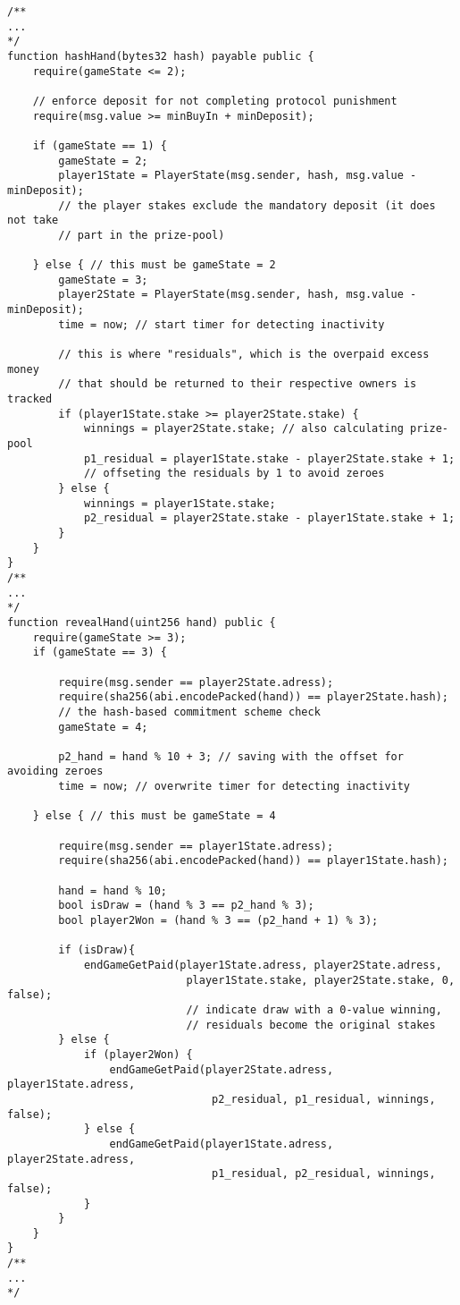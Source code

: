 \documentclass{article}
\begin{document}
    \begin{lstlisting}[language=Solidity]
/**
...
*/
function hashHand(bytes32 hash) payable public {
    require(gameState <= 2);
    
    // enforce deposit for not completing protocol punishment
    require(msg.value >= minBuyIn + minDeposit); 
    
    if (gameState == 1) {
        gameState = 2;
        player1State = PlayerState(msg.sender, hash, msg.value - minDeposit);
        // the player stakes exclude the mandatory deposit (it does not take 
        // part in the prize-pool)
        
    } else { // this must be gameState = 2
        gameState = 3;
        player2State = PlayerState(msg.sender, hash, msg.value - minDeposit);
        time = now; // start timer for detecting inactivity
        
        // this is where "residuals", which is the overpaid excess money 
        // that should be returned to their respective owners is tracked
        if (player1State.stake >= player2State.stake) {
            winnings = player2State.stake; // also calculating prize-pool
            p1_residual = player1State.stake - player2State.stake + 1;
            // offseting the residuals by 1 to avoid zeroes
        } else {
            winnings = player1State.stake;
            p2_residual = player2State.stake - player1State.stake + 1;
        }
    }
}
/**
...
*/
function revealHand(uint256 hand) public {
    require(gameState >= 3);
    if (gameState == 3) {

        require(msg.sender == player2State.adress);
        require(sha256(abi.encodePacked(hand)) == player2State.hash);
        // the hash-based commitment scheme check
        gameState = 4;
        
        p2_hand = hand % 10 + 3; // saving with the offset for avoiding zeroes
        time = now; // overwrite timer for detecting inactivity

    } else { // this must be gameState = 4
    
        require(msg.sender == player1State.adress);
        require(sha256(abi.encodePacked(hand)) == player1State.hash);
        
        hand = hand % 10;
        bool isDraw = (hand % 3 == p2_hand % 3);
        bool player2Won = (hand % 3 == (p2_hand + 1) % 3);
        
        if (isDraw){
            endGameGetPaid(player1State.adress, player2State.adress, 
                            player1State.stake, player2State.stake, 0, false);
                            // indicate draw with a 0-value winning,
                            // residuals become the original stakes
        } else {
            if (player2Won) {
                endGameGetPaid(player2State.adress, player1State.adress, 
                                p2_residual, p1_residual, winnings, false);
            } else {
                endGameGetPaid(player1State.adress, player2State.adress, 
                                p1_residual, p2_residual, winnings, false);
            }   
        }
    }
}
/**
...
*/
    \end{lstlisting}
\end{document}
